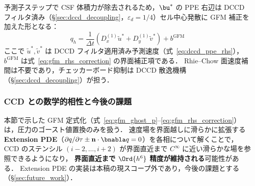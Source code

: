予測子ステップで CSF 体積力が除去されるため，$\bu^*$ の PPE 右辺は DCCD フィルタ済み（§\ref{sec:dccd_decoupling}，$\varepsilon_d=1/4$）セル中心発散に GFM 補正を加えた形となる：
\begin{equation}
  q_h = \frac{1}{\Delta t}\left(D_x^{(1)} \tilde{u}^* + D_y^{(1)} \tilde{v}^*\right) + b^{\mathrm{GFM}}
  \label{eq:gfm_ccd_div}
\end{equation}
ここで $\tilde{u}^*,\tilde{v}^*$ は DCCD フィルタ適用済み予測速度（式~\eqref{eq:dccd_ppe_rhs}），$b^{\mathrm{GFM}}$ は式~\eqref{eq:gfm_rhs_correction} の界面補正項である．
Rhie--Chow 面速度補間は不要であり，チェッカーボード抑制は DCCD 散逸機構（§\ref{sec:dccd_decoupling}）が担う．

\subsubsection{CCD との数学的相性と今後の課題}

本節で示した GFM 定式化（式~\eqref{eq:gfm_ghost_p}--\eqref{eq:gfm_rhs_correction}）は，圧力のゴースト値置換のみを扱う．
速度場を界面越しに滑らかに拡張する \textbf{Extension PDE}（$\partial q/\partial\tau \pm \mathbf{n}\cdot\bnabla q = 0$）を各相について解くことで，
CCD のステンシル $(i-2,\ldots,i+2)$ が界面直近まで $C^\infty$ に近い滑らかな場を参照できるようになり，
\textbf{界面直近まで $\Ord{h^6}$ 精度が維持される}可能性がある．
Extension PDE の実装は本稿の現スコープ外であり，今後の課題とする（§\ref{sec:future_work}）．

